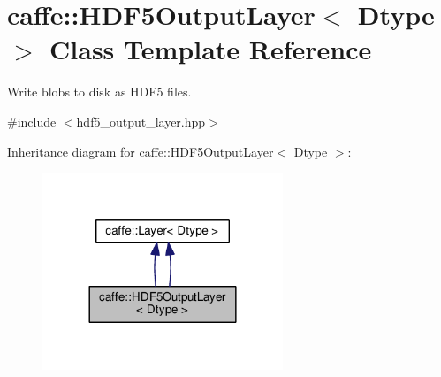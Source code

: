 \hypertarget{classcaffe_1_1_h_d_f5_output_layer}{}\section{caffe\+:\+:H\+D\+F5\+Output\+Layer$<$ Dtype $>$ Class Template Reference}
\label{classcaffe_1_1_h_d_f5_output_layer}


Write blobs to disk as H\+D\+F5 files.  




{\ttfamily \#include $<$hdf5\+\_\+output\+\_\+layer.\+hpp$>$}



Inheritance diagram for caffe\+:\+:H\+D\+F5\+Output\+Layer$<$ Dtype $>$\+:
\nopagebreak
\begin{figure}[H]
\begin{center}
\leavevmode
\includegraphics[width=204pt]{classcaffe_1_1_h_d_f5_output_layer__inherit__graph}
\end{center}
\end{figure}
